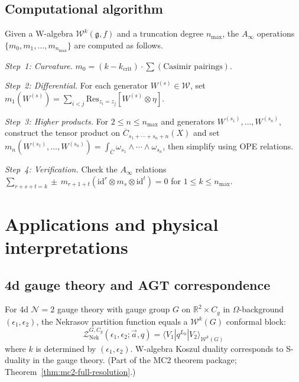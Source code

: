 \subsection{Computational algorithm}

\begin{construction}\label{con:w-ainfty}
Given a W-algebra $\mathcal{W}^k(\mathfrak{g}, f)$ and a truncation degree $n_{\max}$, the $A_\infty$ operations $\{m_0, m_1, \ldots, m_{n_{\max}}\}$ are computed as follows.

\emph{Step~1: Curvature.}
$m_0 = (k - k_{\mathrm{crit}}) \cdot \sum (\text{Casimir pairings})$.

\emph{Step~2: Differential.}
For each generator $W^{(s)} \in \mathcal{W}$, set
$m_1(W^{(s)}) = \sum_{i<j} \mathrm{Res}_{z_i=z_j}[W^{(s)} \otimes \eta]$.

\emph{Step~3: Higher products.}
For $2 \le n \le n_{\max}$ and generators $W^{(s_1)}, \ldots, W^{(s_n)}$, construct the tensor product on $\overline{C}_{s_1+\cdots+s_n+n}(X)$ and set
$m_n(W^{(s_1)}, \ldots, W^{(s_n)}) = \int_{\overline{C}} \omega_{s_1} \wedge \cdots \wedge \omega_{s_n}$,
then simplify using OPE relations.

\emph{Step~4: Verification.}
Check the $A_\infty$ relations $\sum_{r+s+t=k} \pm\, m_{r+1+t}(\mathrm{id}^r \otimes m_s \otimes \mathrm{id}^t) = 0$ for $1 \le k \le n_{\max}$.
\end{construction}

\section{Applications and physical interpretations}

\subsection{4d gauge theory and AGT correspondence}

\begin{conjecture}\label{conj:agt-w-algebra}
For 4d $\mathcal{N}=2$ gauge theory with gauge group $G$ on $\mathbb{R}^2 \times C_g$ in $\Omega$-background $(\epsilon_1, \epsilon_2)$, the Nekrasov partition function equals a $\mathcal{W}^k(G)$ conformal block:
\begin{equation}
\mathcal{Z}_{\text{Nek}}^{G, C_g}(\epsilon_1, \epsilon_2; \vec{a}, q) = \langle V_1 | q^{L_0} | V_2 \rangle_{\mathcal{W}^k(G)}
\end{equation}
where $k$ is determined by $(\epsilon_1, \epsilon_2)$.  W-algebra Koszul duality corresponds to S-duality in the gauge theory.  (Part of the MC2 theorem package; Theorem~\ref{thm:mc2-full-resolution}.)
\end{conjecture}

